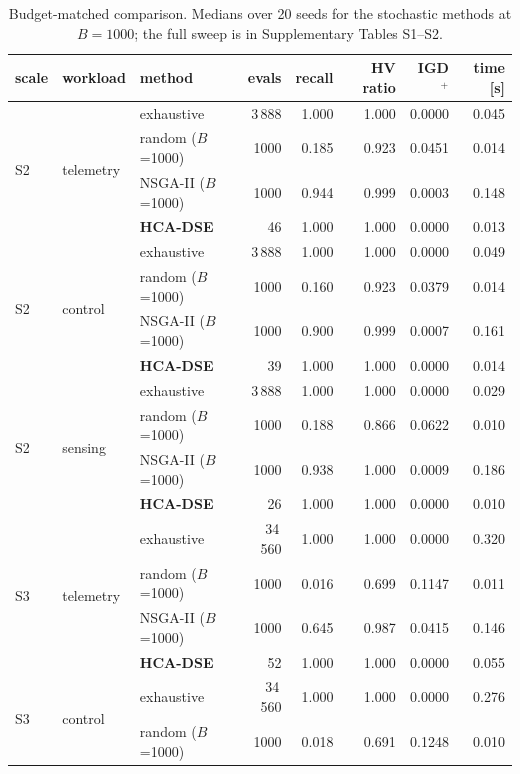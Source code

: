 \documentclass[preprint,11pt,3p]{elsarticle}
\theoremstyle{plain}
\theoremstyle{definition}
\begin{document}
\begin{table}[!htbp]
\centering
\caption{Budget-matched comparison. Medians over 20 seeds for the stochastic methods at $B=1000$;
the full sweep is in Supplementary Tables S1--S2.}
\label{tab:baselines}
\scriptsize
\begin{tabular}{lllrrrrr}
\toprule
scale & workload & method & evals & recall & HV ratio & IGD$^{+}$ & time [s] \\
\midrule

\multirow{4}{*}{S2} & \multirow{4}{*}{telemetry} & exhaustive & 3\,888 & 1.000 & 1.000 & 0.0000 & 0.045 \\
 & & random ($B$=1000) & 1000 & 0.185 & 0.923 & 0.0451 & 0.014 \\
 & & NSGA-II ($B$=1000) & 1000 & 0.944 & 0.999 & 0.0003 & 0.148 \\
 & & \textbf{HCA-DSE} & 46 & 1.000 & 1.000 & 0.0000 & 0.013 \\
\midrule
\multirow{4}{*}{S2} & \multirow{4}{*}{control} & exhaustive & 3\,888 & 1.000 & 1.000 & 0.0000 & 0.049 \\
 & & random ($B$=1000) & 1000 & 0.160 & 0.923 & 0.0379 & 0.014 \\
 & & NSGA-II ($B$=1000) & 1000 & 0.900 & 0.999 & 0.0007 & 0.161 \\
 & & \textbf{HCA-DSE} & 39 & 1.000 & 1.000 & 0.0000 & 0.014 \\
\midrule
\multirow{4}{*}{S2} & \multirow{4}{*}{sensing} & exhaustive & 3\,888 & 1.000 & 1.000 & 0.0000 & 0.029 \\
 & & random ($B$=1000) & 1000 & 0.188 & 0.866 & 0.0622 & 0.010 \\
 & & NSGA-II ($B$=1000) & 1000 & 0.938 & 1.000 & 0.0009 & 0.186 \\
 & & \textbf{HCA-DSE} & 26 & 1.000 & 1.000 & 0.0000 & 0.010 \\
\midrule
\multirow{4}{*}{S3} & \multirow{4}{*}{telemetry} & exhaustive & 34\,560 & 1.000 & 1.000 & 0.0000 & 0.320 \\
 & & random ($B$=1000) & 1000 & 0.016 & 0.699 & 0.1147 & 0.011 \\
 & & NSGA-II ($B$=1000) & 1000 & 0.645 & 0.987 & 0.0415 & 0.146 \\
 & & \textbf{HCA-DSE} & 52 & 1.000 & 1.000 & 0.0000 & 0.055 \\
\midrule
\multirow{4}{*}{S3} & \multirow{4}{*}{control} & exhaustive & 34\,560 & 1.000 & 1.000 & 0.0000 & 0.276 \\
 & & random ($B$=1000) & 1000 & 0.018 & 0.691 & 0.1248 & 0.010 \\

\end{tabular}
\end{table}
\end{document}
